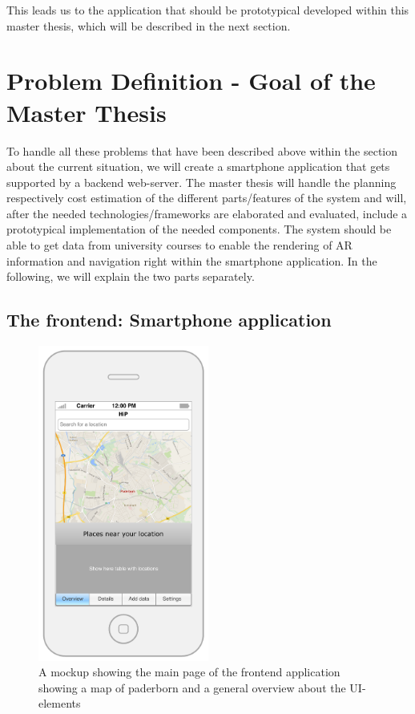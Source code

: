 \documentclass[a4page]{article}
\begin{document}
This leads us to the application that should be prototypical developed within this master thesis, which will be described in the next section. 
  
\section{Problem Definition - Goal of the Master Thesis} 
\label{ProblemDef}
To handle all these problems that have been described above within the section about the current situation, we will create a smartphone application that gets supported by a backend web-server. The master thesis will handle the planning respectively cost estimation of the different parts/features of the system and will, after the needed technologies/frameworks are elaborated and evaluated, include a prototypical implementation of the needed components. The system should be able to get data from university courses to enable the rendering of \ac{AR} information and navigation right within the smartphone application. In the following, we will explain the two parts separately.

\subsection{The frontend: Smartphone application} 
\begin{figure}[th]
\centerline{\includegraphics[width=0.5\textwidth]{gfx/mockup_app_1}}
\caption{A mockup showing the main page of the frontend application showing a map of paderborn and a general overview about the UI-elements}
\label{app1}
\end{figure}
\end{document}
